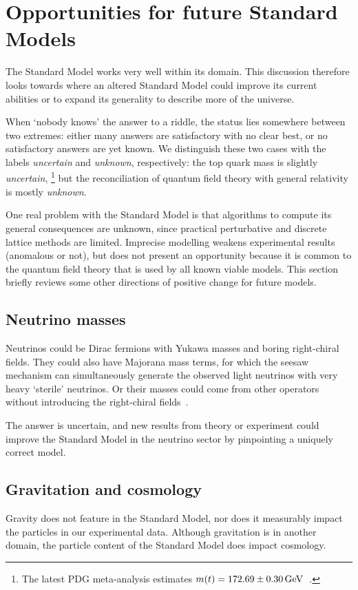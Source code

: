 \section{Opportunities for future Standard Models}
The Standard Model works very well within its domain.
This discussion therefore looks towards where an altered Standard Model could
improve its current abilities or to expand its generality to describe more of
the universe.

When `nobody knows' the answer to a riddle, the status lies somewhere between
two extremes:
either many answers are satisfactory with no clear best,
or no satisfactory answers are yet known.
We distinguish these two cases with the labels
\emph{uncertain} and \emph{unknown}, respectively:
the top quark mass is slightly \emph{uncertain},%
\footnote{%
The latest PDG meta-analysis estimates
$m(t) = 172.69 \pm 0.30\,\eV[G]$~\cite{pdg2022ynf}.
}
but the reconciliation of quantum field theory with general relativity is
mostly \emph{unknown}.

One real problem with the Standard Model is that algorithms to compute its
general consequences are unknown, since practical perturbative and discrete
lattice methods are limited.
Imprecise modelling weakens experimental results (anomalous or not),
but does not present an opportunity because it is common to the quantum field
theory that is used by all known viable models.
This section briefly reviews some other directions of positive change for
future models.


\subsection{Neutrino masses}
Neutrinos could be Dirac fermions with Yukawa masses and boring right-chiral
fields.
They could also have Majorana mass terms, for which the seesaw mechanism can
simultaneously generate the observed light neutrinos with very heavy `sterile'
neutrinos.
Or their masses could come from other operators without  introducing the
right-chiral fields~\cite{
thomson2013modern,
chala2021neutrino,
wells2020discovery
}.

The answer is uncertain, and new results from theory or experiment could
improve the Standard Model in the neutrino sector
by pinpointing a uniquely correct model.


\subsection{Gravitation and cosmology}
Gravity does not feature in the Standard Model, nor does it measurably impact
the particles in our experimental data.
Although gravitation is in another domain, the particle content of the
Standard Model does impact cosmology.

